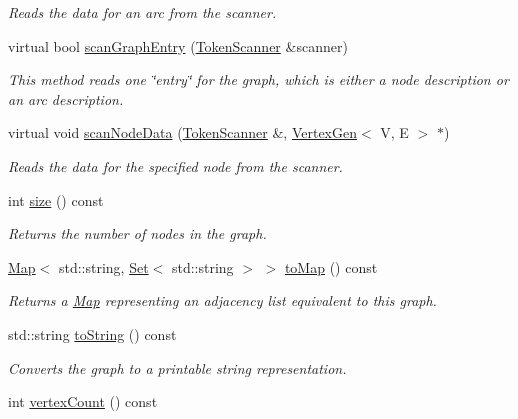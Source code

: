 \begin{DoxyCompactItemize}
\begin{DoxyCompactList}\small\item\em Reads the data for an arc from the scanner. \end{DoxyCompactList}\item 
virtual bool \mbox{\hyperlink{classGraph_a1c4e1a05a40013ce4e4bb539d05b9937}{scan\+Graph\+Entry}} (\mbox{\hyperlink{classTokenScanner}{Token\+Scanner}} \&scanner)
\begin{DoxyCompactList}\small\item\em This method reads one \char`\"{}entry\char`\"{} for the graph, which is either a node description or an arc description. \end{DoxyCompactList}\item 
virtual void \mbox{\hyperlink{classGraph_a0fc2ca3535b7bff7759aa0c1d35ff08b}{scan\+Node\+Data}} (\mbox{\hyperlink{classTokenScanner}{Token\+Scanner}} \&, \mbox{\hyperlink{classVertexGen}{Vertex\+Gen}}$<$ V, E $>$ $\ast$)
\begin{DoxyCompactList}\small\item\em Reads the data for the specified node from the scanner. \end{DoxyCompactList}\item 
int \mbox{\hyperlink{classGraph_af9593d4a5ff4274efaf429cb4f9e57cc}{size}} () const
\begin{DoxyCompactList}\small\item\em Returns the number of nodes in the graph. \end{DoxyCompactList}\item 
\mbox{\hyperlink{classMap}{Map}}$<$ std\+::string, \mbox{\hyperlink{classstanfordcpplib_1_1collections_1_1GenericSet}{Set}}$<$ std\+::string $>$ $>$ \mbox{\hyperlink{classBasicGraphGen_a66498d3675a5bc08fa30a032d41764f7}{to\+Map}} () const
\begin{DoxyCompactList}\small\item\em Returns a \mbox{\hyperlink{classMap}{Map}} representing an adjacency list equivalent to this graph. \end{DoxyCompactList}\item 
std\+::string \mbox{\hyperlink{classGraph_a1fe5121d6528fdea3f243321b3fa3a49}{to\+String}} () const
\begin{DoxyCompactList}\small\item\em Converts the graph to a printable string representation. \end{DoxyCompactList}\item 
int \mbox{\hyperlink{classBasicGraphGen_a68eb4830a4800ed7704895c16a8982be}{vertex\+Count}} () const

\end{DoxyCompactItemize}
